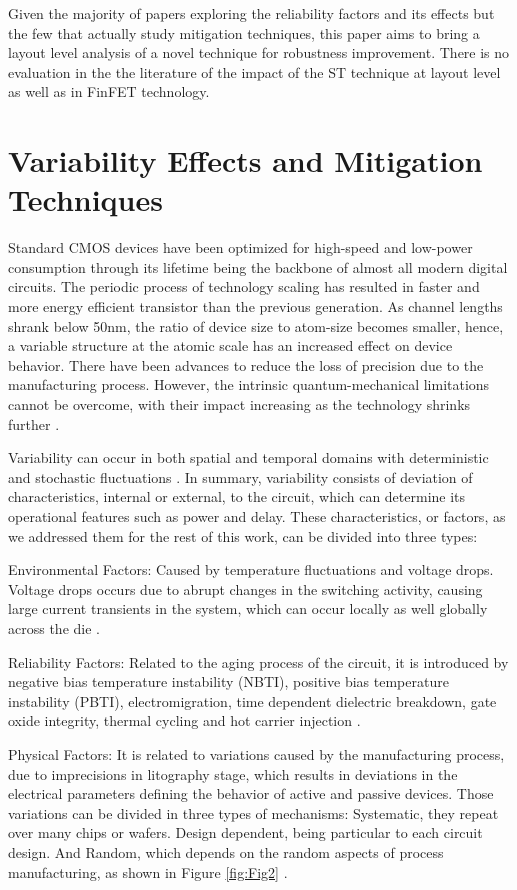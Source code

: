 \documentclass[ecp,tc, english]{iiufrgs}
\begin{document}
Given the majority of papers exploring the reliability factors and its effects but the few that actually study mitigation techniques, this paper aims to bring a layout level analysis of a novel technique for robustness improvement. There is no evaluation in the the literature of the impact of the ST technique at layout level as well as in FinFET technology.

\chapter{Variability Effects and Mitigation Techniques}

Standard CMOS devices have been optimized for high-speed and low-power consumption through its lifetime being the backbone of almost all modern digital circuits. The periodic process of technology scaling has resulted in faster and more energy efficient transistor than the previous generation. As channel lengths shrank below 50nm, the ratio of device size to atom-size becomes smaller, hence, a variable structure at the atomic scale has an increased effect on device behavior. There have been advances to reduce the loss of precision due to the manufacturing process. However, the intrinsic quantum-mechanical limitations cannot be overcome, with their impact increasing as the technology shrinks further \cite{asenov1999random}. 

Variability can occur in both spatial and temporal domains with deterministic and stochastic fluctuations \cite{walker2010optimizing}. In summary, variability consists of deviation of characteristics, internal or external, to the circuit, which can determine its operational features such as power and delay. These characteristics, or factors, as we addressed them for the rest of this work, can be divided into three types: 
 
Environmental Factors:  
Caused by temperature fluctuations and voltage drops. Voltage drops occurs due to abrupt changes in the switching activity, causing large current transients in the system, which can occur locally as well globally across the die \cite{nassif:08}. 
 
Reliability Factors: 
Related to the aging process of the circuit, it is introduced by negative bias temperature instability (NBTI), positive bias temperature instability (PBTI), electromigration, time dependent dielectric breakdown, gate oxide integrity, thermal cycling and hot carrier injection \cite{nassif:08}.
 
Physical Factors:
It is related to variations caused by the manufacturing process, due to imprecisions in litography stage, which results in deviations in the electrical parameters defining the behavior of active and passive devices. Those variations can be divided in three types of mechanisms: Systematic, they repeat over many chips or wafers. Design dependent, being particular to each circuit design. And Random, which depends on the random aspects of process manufacturing, as shown in Figure \ref{fig:Fig2} \cite{nassif:08}.
\end{document}
